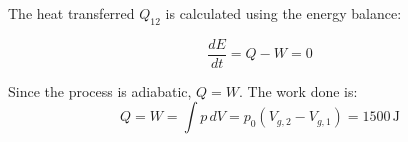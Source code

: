 The heat transferred \( Q_{12} \) is calculated using the energy balance:  

\[
\frac{dE}{dt} = Q - W = 0
\]  

Since the process is adiabatic, \( Q = W \). The work done is:  
\[
Q = W = \int p \, dV = p_0 (V_{g,2} - V_{g,1}) = 1500 \, \text{J}
\]